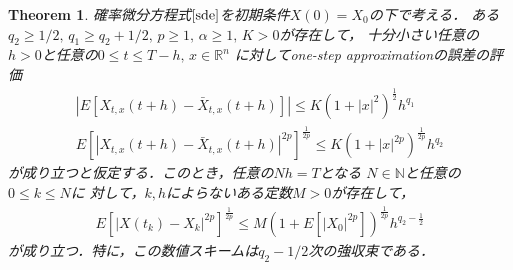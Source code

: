 \documentclass[dvipdfmx,autodetect-engine]{jsarticle}
\newtheorem{theorem}{Theorem}[section]
\theoremstyle{remark}
\theoremstyle{definition}
\newcommand{\R}{\mathbb{R}}
\newcommand{\N}{\mathbb{N}}
\newcommand{\abs}[1]{\left\lvert#1\right\rvert}
\begin{document}
\begin{theorem}
    確率微分方程式$\eqref{sde}$を初期条件$X(0)=X_{0}$の下で考える．
    ある$q_{2}\geq 1/2,\, q_{1} \geq q_{2} + 1/2 ,\, 
    p\geq 1,\, \alpha \geq 1,\, K>0$が存在して，
    十分小さい任意の$h>0$と任意の$0\leq t\leq T-h,\, x\in \R^{n}$
    に対してone-step approximationの誤差の評価
    \begin{align}
        \abs{E[X_{t,x}(t+h) - \bar{X}_{t,x}(t+h)]} 
        \leq K(1+\abs{x}^{2})^{\frac{1}{2}} h^{q_{1}} \\
        E[\abs{X_{t,x}(t+h)- \bar{X}_{t,x}(t+h)}^{2p}]^{\frac{1}{2p}}
        \leq K(1+\abs{x}^{2p})^{\frac{1}{2p}} h^{q_{2}}
    \end{align}
    が成り立つと仮定する．このとき，任意の$Nh=T$となる
    $N \in \N$と任意の$0\leq k\leq N$に
    対して，$k,h$によらないある定数$M>0$が存在して，
    \begin{align}
        E[\abs{X(t_{k}) - X_{k}}^{2p}]^{\frac{1}{2p}}
        \leq M(1+E[\abs{X_{0}}^{2p}])^{\frac{1}{2p}} h^{q_{2} - \frac{1}{2}}
    \end{align}
    が成り立つ．特に，この数値スキームは$q_{2}-1/2$次の強収束である．
\end{theorem}
\end{document}
